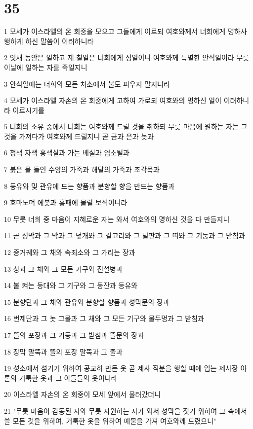 \chapter{35}

\par 1 모세가 이스라엘의 온 회중을 모으고 그들에게 이르되 여호와께서 너희에게 명하사 행하게 하신 말씀이 이러하니라
\par 2 엿새 동안은 일하고 제 칠일은 너희에게 성일이니 여호와께 특별한 안식일이라 무릇 이날에 일하는 자를 죽일지니
\par 3 안식일에는 너희의 모든 처소에서 불도 피우지 말지니라
\par 4 모세가 이스라엘 자손의 온 회중에게 고하여 가로되 여호와의 명하신 일이 이러하니라 이르시기를
\par 5 너희의 소유 중에서 너희는 여호와께 드릴 것을 취하되 무릇 마음에 원하는 자는 그것을 가져다가 여호와께 드릴지니 곧 금과 은과 놋과
\par 6 청색 자색 홍색실과 가는 베실과 염소털과
\par 7 붉은 물 들인 수양의 가죽과 해달의 가죽과 조각목과
\par 8 등유와 및 관유에 드는 향품과 분향할 향을 만드는 향품과
\par 9 호마노며 에봇과 흉패에 물릴 보석이니라
\par 10 무릇 너희 중 마음이 지혜로운 자는 와서 여호와의 명하신 것을 다 만들지니
\par 11 곧 성막과 그 막과 그 덮개와 그 갈고리와 그 널판과 그 띠와 그 기둥과 그 받침과
\par 12 증거궤와 그 채와 속죄소와 그 가리는 장과
\par 13 상과 그 채와 그 모든 기구와 진설병과
\par 14 불 켜는 등대와 그 기구와 그 등잔과 등유와
\par 15 분향단과 그 채와 관유와 분향할 향품과 성막문의 장과
\par 16 번제단과 그 놋 그물과 그 채와 그 모든 기구와 물두멍과 그 받침과
\par 17 뜰의 포장과 그 기둥과 그 받침과 뜰문의 장과
\par 18 장막 말뚝과 뜰의 포장 말뚝과 그 줄과
\par 19 성소에서 섬기기 위하여 공교히 만든 옷 곧 제사 직분을 행할 때에 입는 제사장 아론의 거룩한 옷과 그 아들들의 옷이니라
\par 20 이스라엘 자손의 온 회중이 모세 앞에서 물러갔더니
\par 21 "무릇 마음이 감동된 자와 무릇 자원하는 자가 와서 성막을 짓기 위하여 그 속에서 쓸 모든 것을 위하여, 거룩한 옷을 위하여 예물을 가져 여호와께 드렸으니"
